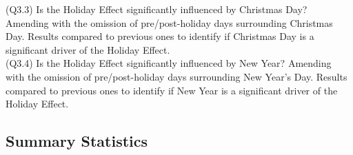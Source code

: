 \documentclass[11pt, english]{article}
\begin{document}
			(Q3.3) Is the Holiday Effect significantly influenced by Christmas Day? Amending with the omission of pre/post-holiday days surrounding Christmas Day. Results compared to previous ones to identify if Christmas Day is a significant driver of the Holiday Effect.\\

			(Q3.4) Is the Holiday Effect significantly influenced by New Year? Amending with the omission of pre/post-holiday days surrounding New Year’s Day. Results compared to previous ones to identify if New Year is a significant driver of the Holiday Effect.

	\newpage

	\subsection{Summary Statistics}
\end{document}
